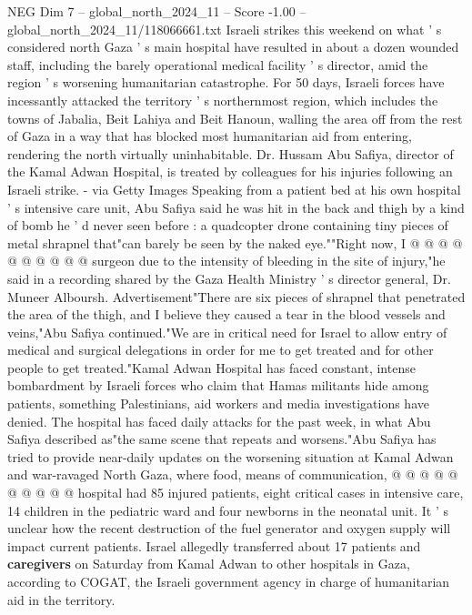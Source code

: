 \begin{textsample}{NEG Dim 7 – global\_north\_2024\_11 – Score -1.00 – global\_north\_2024\_11/118066661.txt}  \label{ex:f7_neg_336}
Israeli strikes this weekend on what ' s considered north Gaza ' s main hospital have resulted in about a dozen wounded staff, including the barely operational medical facility ' s director, amid the region ' s worsening humanitarian catastrophe.
For 50 days, Israeli forces have incessantly attacked the territory ' s northernmost region, which includes the towns of Jabalia, Beit Lahiya and Beit Hanoun, walling the area off from the rest of Gaza in a way that has blocked most humanitarian aid from entering, rendering the north virtually uninhabitable.
Dr.
Hussam Abu Safiya, director of the Kamal Adwan Hospital, is treated by colleagues for his injuries following an Israeli strike. - via Getty Images Speaking from a patient bed at his own hospital ' s intensive care unit, Abu Safiya said he was hit in the back and thigh by a kind of bomb he ' d never seen before : a quadcopter drone containing tiny pieces of metal shrapnel that"can barely be seen by the naked eye.""Right now, I @ @ @ @ @ @ @ @ @ @ surgeon due to the intensity of bleeding in the site of injury,"he said in a recording shared by the Gaza Health Ministry ' s director general, Dr.
Muneer Alboursh.
Advertisement"There are six pieces of shrapnel that penetrated the area of the thigh, and I believe they caused a tear in the blood vessels and veins,"Abu Safiya continued."We are in critical need for Israel to allow entry of medical and surgical delegations in order for me to get treated and for other people to get treated."Kamal Adwan Hospital has faced constant, intense bombardment by Israeli forces who claim that Hamas militants hide among patients, something Palestinians, aid workers and media investigations have denied.
The hospital has faced daily attacks for the past week, in what Abu Safiya described as"the same scene that repeats and worsens."Abu Safiya has tried to provide near-daily updates on the worsening situation at Kamal Adwan and war-ravaged North Gaza, where food, means of communication, @ @ @ @ @ @ @ @ @ @ hospital had 85 injured patients, eight critical cases in intensive care, 14 children in the pediatric ward and four newborns in the neonatal unit.
It ' s unclear how the recent destruction of the fuel generator and oxygen supply will impact current patients.
Israel allegedly transferred about 17 patients and \textbf{caregivers} on Saturday from Kamal Adwan to other hospitals in Gaza, according to COGAT, the Israeli government agency in charge of humanitarian aid in the territory.

\end{textsample}
